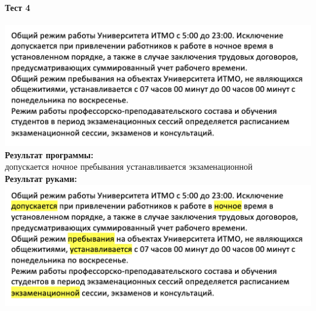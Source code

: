 \documentclass[12pt,onecolumn]{article}
\begin{document}
\begin{flushleft}
\paragraph{Тест 4}
\hfill \break
\includegraphics[scale=0.4]{prog2/p4.png}\\
\textbf{Результат программы:}\\
допускается ночное пребывания устанавливается экзаменационной\\
\textbf{Результат руками:}\\
\includegraphics[scale=0.4]{prog2/p4+.png}\\

\end{flushleft}
\end{document}
